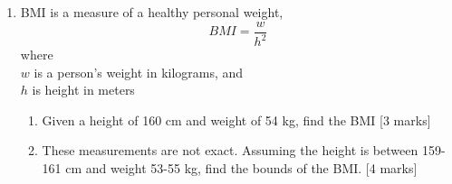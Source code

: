 \documentclass[12pt, twoside]{article}
\begin{document}
\begin{enumerate}[itemsep=0.5cm]
\newpage
\item BMI is a measure of a healthy personal weight, 
  \[\displaystyle BMI = \frac{w}{h^2}\]
    where \\
    $w$ is a person's weight in kilograms, and \\
    $h$ is height in meters
    \begin{enumerate} 
        \item Given a height of 160 cm and weight of 54 kg, find the BMI  \hfill [3 marks]
        \item These measurements are not exact. Assuming the height is between 159-161 cm and weight 53-55 kg, find the bounds of the BMI.  \hfill [4 marks]
      \end{enumerate}


       
\end{enumerate}
\end{document}
